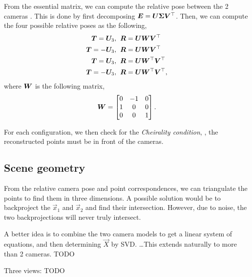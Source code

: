 From the essential matrix, we can compute the relative pose between the 2 cameras
\citep{longuet1981computer}. This is done by first decomposing $\bm{E} =
\bm{U} \bm{\Sigma} \bm{V}^\top$. Then, we
can compute the four possible relative poses as the following,
\begin{align*}
  \bm{T} = \bm{U}_3,& \hspace{0.2cm} \bm{R} = \bm{U}\bm{W}\bm{V}^\top \\
  \bm{T} = -\bm{U}_3,& \hspace{0.2cm} \bm{R} = \bm{U}\bm{W}\bm{V}^\top \\
  \bm{T} = \bm{U}_3,& \hspace{0.2cm} \bm{R} = \bm{U}\bm{W}^\top\bm{V}^\top \\
  \bm{T} = -\bm{U}_3,& \hspace{0.2cm} \bm{R} = \bm{U}\bm{W}^\top\bm{V}^\top
,\end{align*}
where $\bm{W}$ is the following matrix, \[
  \bm{W} = \begin{bmatrix} 
    0 & -1 & 0 \\
    1 & 0 & 0 \\
    0 & 0 & 1
  \end{bmatrix} 
.\]

For each configuration, we then check for the \textit{Cheirality condition},
\ie, the reconstructed points must be in front of the cameras.

\subsection{Scene geometry}

From the relative camera pose and point correspondences, we can triangulate the
points to find them in three dimensions. A possible solution would be to
backproject the $\vec{x}_1$ and $\vec{x}_2$ and find their intersection.
However, due to noise, the two backprojections will never truly intersect.

A better idea is to combine the two camera models to get a linear system of
equations, and then determining $\vec{X}$ by SVD. \ldots This extends naturally
to more than 2 cameras. TODO

Three views: TODO
